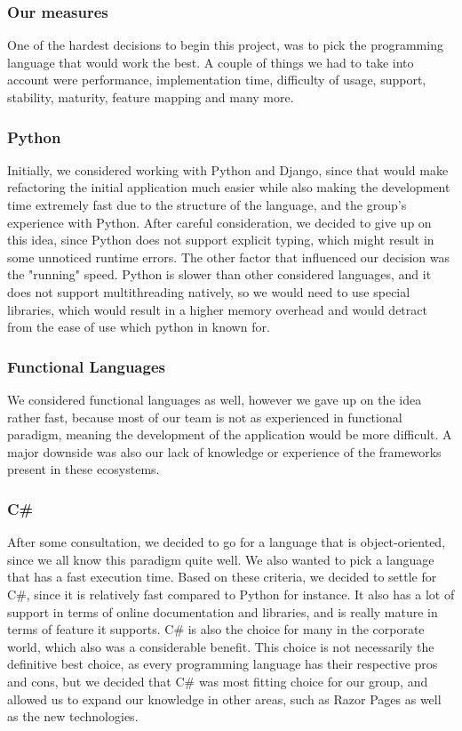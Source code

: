 \subsubsection{Our measures}
One of the hardest decisions to begin this project, was to pick the programming language that would work the best. A couple of things we had to take into account were performance, implementation time, difficulty of usage, support, stability, maturity, feature mapping and many more. 
\subsubsection{Python}
Initially, we considered working with Python and Django, since that would make refactoring the initial application much easier while also making the development time extremely fast due to the structure of the language, and the group's experience with Python. After careful consideration, we decided to give up on this idea, since Python does not support explicit typing, which might result in some unnoticed runtime errors. The other factor that influenced our decision was the "running" speed. Python is slower than other considered languages, and it does not support multithreading natively, so we would need to use special libraries, which would result in a higher memory overhead and would detract from the ease of use which python in known for.
\subsubsection{Functional Languages}
We considered functional languages as well, however we gave up on the idea rather fast, because most of our team is not as experienced in functional paradigm, meaning the development of the application would be more difficult. A major downside was also our lack of knowledge or experience of the frameworks present in these ecosystems.
\subsubsection{C\#}
After some consultation, we decided to go for a language that is object-oriented, since we all know this paradigm quite well. We also wanted to pick a language that has a fast execution time. Based on these criteria, we decided to settle for C\#, since it is relatively fast compared to Python for instance. It also has a lot of support in terms of online documentation and libraries, and is really mature in terms of feature it supports. C\# is also the choice for many in the corporate world, which also was a considerable benefit.
This choice is not necessarily the definitive best choice, as every programming language has their respective pros and cons, but we decided that C\# was most fitting choice for our group, and allowed us to expand our knowledge in other areas, such as Razor Pages as well as the new technologies.